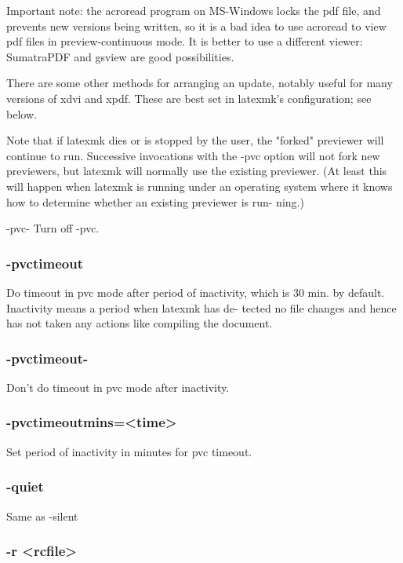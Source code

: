 Important note: the acroread program on MS-Windows locks the pdf
file, and prevents new versions being written, so it  is  a  bad
idea  to  use  acroread  to view pdf files in preview-continuous
mode.  It is better to use a different  viewer:  SumatraPDF  and
gsview are good possibilities.

There  are  some  other methods for arranging an update, notably
useful for many versions of xdvi and xpdf.  These are  best  set
in latexmk's configuration; see below.

Note  that  if  latexmk  dies  or  is  stopped  by the user, the
"forked" previewer will continue to run.  Successive invocations
with  the  -pvc option will not fork new previewers, but latexmk
will normally use the existing previewer.  (At least  this  will
happen  when  latexmk is running under an operating system where
it knows how to determine whether an existing previewer is  run-
ning.)


-pvc-  Turn off -pvc.


\subsubsection{-pvctimeout}

Do  timeout  in pvc mode after period of inactivity, which is 30
min. by default.  Inactivity means a period when latexmk has de-
tected  no file changes and hence has not taken any actions like
compiling the document.


\subsubsection{-pvctimeout-}

Don't do timeout in pvc mode after inactivity.

\subsubsection{-pvctimeoutmins=<time>}

Set period of inactivity in minutes for pvc timeout.

\subsubsection{-quiet}

Same as -silent

\subsubsection{-r <rcfile>}

